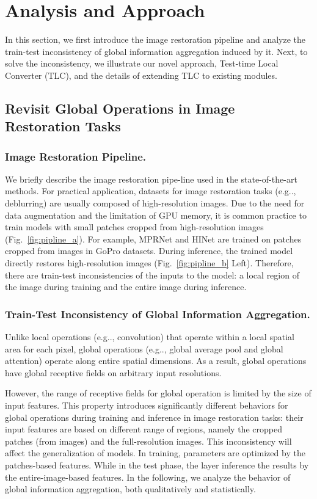 \documentclass[runningheads]{llncs}
\makeatletter
\DeclareRobustCommand\onedot{\futurelet\@let@token\@onedot}
\def\@onedot{\ifx\@let@token.\else.\null\fi\xspace}
\def\eg{e.g\onedot}
\makeatother
\begin{document}
\section{Analysis and Approach}
In this section, we first introduce the image restoration pipeline and analyze the train-test inconsistency of global information aggregation induced by it.
Next, to solve the inconsistency, we illustrate our novel approach, Test-time Local Converter (TLC), and the details of extending TLC to existing modules.

\subsection{Revisit Global Operations in Image Restoration Tasks}
\subsubsection{Image Restoration Pipeline.}
We briefly describe the image restoration pipe-line used in the state-of-the-art methods. 
For practical application, datasets for image restoration tasks (\eg, deblurring) are usually composed of high-resolution images. 
Due to the need for data augmentation and the limitation of GPU memory, it is common practice to train models with small patches cropped from high-resolution images (Fig.~\ref{fig:pipline_a}). For example, MPRNet and HINet are trained on  patches cropped from  images in GoPro datasets. During inference, the trained model directly restores high-resolution images (Fig.~\ref{fig:pipline_b} Left).
Therefore, there are train-test inconsistencies of the inputs to the model: a local region of the image during training and the entire image during inference.






\subsubsection{Train-Test Inconsistency of Global Information Aggregation. }
Unlike local operations (\eg, convolution) that operate within a local spatial area for each pixel, global operations (\eg, global average pool and global attention) operate along entire spatial dimensions. As a result, global operations have global receptive fields on arbitrary input resolutions. 

However, the range of receptive fields for global operation is limited by the size of input features.
This property introduces significantly different behaviors for global operations during training and inference in image restoration tasks: their input features are based on different range of regions, namely the cropped patches (from images) and the full-resolution images. 
This inconsistency will affect the generalization of models. In training, parameters are optimized by the patches-based features. While in the test phase, the layer inference the results by the entire-image-based features. 
In the following, we analyze the behavior of global information aggregation, both qualitatively and statistically. 
\end{document}

